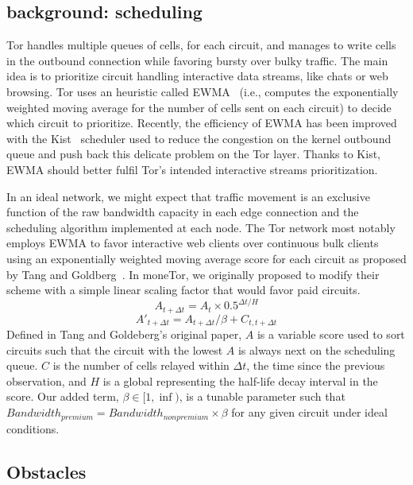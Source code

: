 \subsection{background: scheduling}

Tor handles multiple queues of cells, for each circuit, and manages to write
cells in the outbound connection while favoring bursty over bulky traffic. The
main idea is to prioritize circuit handling interactive data streams, like chats
or web browsing. Tor uses an heuristic called EWMA~\cite{ccs10-scheduling}
(i.e., computes the exponentially weighted moving average for the number of
cells sent on each circuit) to decide which circuit to prioritize. Recently, the
efficiency of EWMA has been improved with the Kist~\cite{jansen14-kist}
scheduler used to reduce the congestion on the kernel outbound queue and push
back this delicate problem on the Tor layer. Thanks to Kist, EWMA should better
fulfil Tor's intended interactive streams prioritization. %

In an ideal network, we might expect that traffic movement is an exclusive
function of the raw bandwidth capacity in each edge connection and the
scheduling algorithm implemented at each node.
The Tor network most notably
employs EWMA to favor interactive web clients over
continuous bulk clients using an exponentially weighted moving average score for
each circuit as proposed by Tang and Goldberg~\cite{tang2010improved}. 
In moneTor, we originally proposed to modify their scheme with a simple linear
scaling factor that would favor paid circuits.
\begin{equation}
  A_{t + \Delta t} = A_t \times 0.5^{\Delta t/H}
\end{equation}
\begin{equation}
  A'_{t + \Delta t} = A_{t + \Delta t} / \beta + C_{t, t + \Delta t}
\end{equation}
Defined in Tang and Goldeberg's original paper, $A$ is a variable score used to
sort circuits such that the circuit with the lowest $A$ is always next on the
scheduling queue. $C$ is the number of cells relayed within $\Delta t$, the time
since the previous observation, and $H$ is a global representing the half-life
decay interval in the score. Our added term, $\beta \in [1, \inf)$, is a tunable
parameter such that $Bandwidth_{premium} = Bandwidth_{nonpremium} \times \beta$
for any given circuit under ideal conditions.

\subsection{Obstacles}


